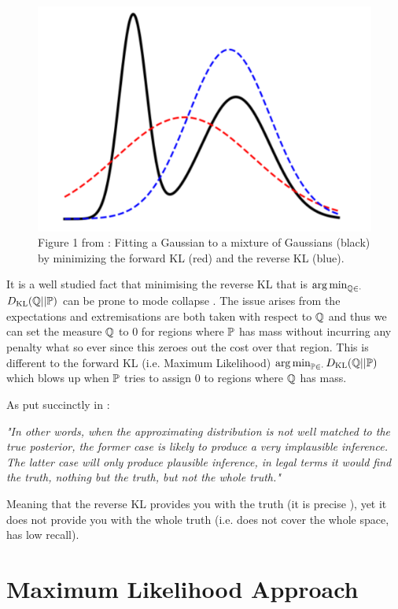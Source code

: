 \documentclass[a4paper,12pt,twoside,openright]{report}
\theoremstyle{definition}
\begin{document}
\begin{figure}
    \centering
    \includegraphics[scale=0.5]{images/zhang_et_al.PNG}
    \caption{Figure 1 from \cite{zhang2019variational}:  Fitting a Gaussian to a mixture of Gaussians (black) by
minimizing the forward KL (red) and the reverse KL (blue).}
    \label{fig:babrber_kl}
\end{figure}

It is a well studied fact that minimising the reverse KL that is $\argmin_{\Q \in \cdot }$ $\KL(\Q ||\P)$ can be prone to mode collapse \citep{zhang2019variational}. The issue arises from the expectations and extremisations are both taken with respect to $\Q$ and thus we can set the measure $\Q$ to 0 for regions where $\P$ has mass without incurring any penalty what so ever since this zeroes out the cost over that region. This is different to the forward KL (i.e. Maximum Likelihood)  $\argmin_{\P \in \cdot }\KL(\Q ||\P)$  which blows up  when $\P$ tries to assign $0$ to regions where $\Q$ has mass.

As put succinctly in \cite{lawrence2001variational}:

\textit{"In other words, when the approximating distribution is not
well matched to the true posterior, the former case is likely to produce a very implausible inference.
The latter case will only produce plausible inference, in legal terms it would find the truth, nothing
but the truth, but not the whole truth."}

Meaning that the reverse KL provides you with the truth (it is precise ), yet  it does not provide you with the whole truth (i.e. does not cover the whole space, has low recall).


\section{Maximum Likelihood Approach \citep{pavon2018data}}
\end{document}
